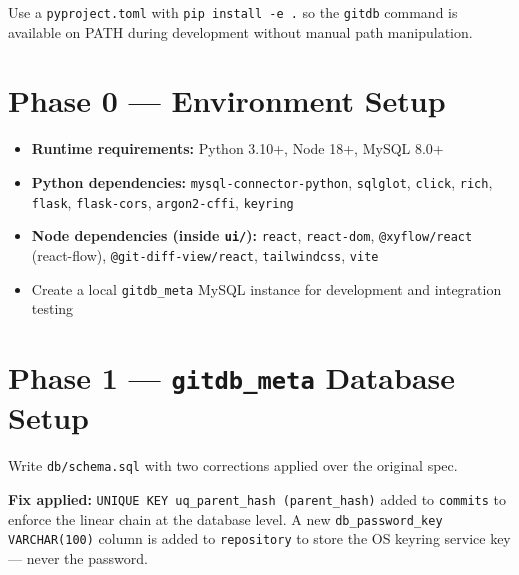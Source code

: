 \documentclass[12pt, a4paper]{article}
\begin{document}
\begin{tcolorbox}[infobox]
Use a \texttt{pyproject.toml} with \texttt{pip install -e .} so the
\texttt{gitdb} command is available on PATH during development without manual
path manipulation.
\end{tcolorbox}

\section{Phase 0 --- Environment Setup}

\begin{itemize}[leftmargin=1.5em, itemsep=0.3em]
    \item \textbf{Runtime requirements:} Python 3.10+, Node 18+, MySQL 8.0+
    \item \textbf{Python dependencies:} \texttt{mysql-connector-python},
    \texttt{sqlglot}, \texttt{click}, \texttt{rich}, \texttt{flask},
    \texttt{flask-cors}, \texttt{argon2-cffi}, \texttt{keyring}
    \item \textbf{Node dependencies (inside \texttt{ui/}):} \texttt{react},
    \texttt{react-dom}, \texttt{@xyflow/react} (react-flow),
    \texttt{@git-diff-view/react}, \texttt{tailwindcss}, \texttt{vite}
    \item Create a local \texttt{gitdb\_meta} MySQL instance for development and
    integration testing
\end{itemize}

\section{Phase 1 --- \texttt{gitdb\_meta} Database Setup}

Write \texttt{db/schema.sql} with two corrections applied over the original spec.

\begin{tcolorbox}[fixbox]
\textbf{Fix applied:} \texttt{UNIQUE KEY uq\_parent\_hash (parent\_hash)}
added to \texttt{commits} to enforce the linear chain at the database level.
A new \texttt{db\_password\_key VARCHAR(100)} column is added to
\texttt{repository} to store the OS keyring service key --- never the password.
\end{tcolorbox}
\end{document}
